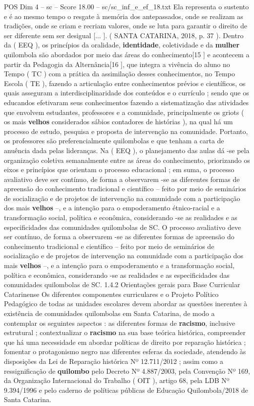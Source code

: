 \begin{textsample}{POS Dim 4 – sc – Score 18.00 – sc/sc\_inf\_e\_ef\_18.txt}
Ela representa o sustento e é ao mesmo tempo o resgate à memória dos antepassados, onde se realizam as tradições, onde se criam e recriam valores, onde se luta para garantir o direito de ser diferente sem ser desigual [... ]. ( SANTA CATARINA, 2018, p. 37 ).
Dentro da ( EEQ ), os princípios da oralidade, \textbf{identidade}, coletividade e da \textbf{mulher} quilombola são abordados por meio das áreas do conhecimento[15 ] e acontecem a partir da Pedagogia da Alternância[16 ], que integra a vivência do aluno no Tempo ( TC ) com a prática da assimilação desses conhecimentos, no Tempo Escola ( TE ), fazendo a articulação entre conhecimentos prévios e científicos, os quais asseguram a interdisciplinaridade dos conteúdos e o currículo ; sendo que os educandos efetivaram seus conhecimentos fazendo a sistematização das atividades que envolvem estudantes, professores e a comunidade, principalmente os griots ( os mais \textbf{velhos} considerados sábios contadores de histórias ), na qual há um processo de estudo, pesquisa e proposta de intervenção na comunidade.
Portanto, os professores são preferencialmente quilombolas e que tenham a carta de anuência dada pelas lideranças.
Na ( EEQ ), o planejamento das aulas dá -se pela organização coletiva semanalmente entre as áreas do conhecimento, priorizando os eixos e princípios que orientam o processo educacional ; em suma, o processo avaliativo deve ser contínuo, de forma a observarem -se as diferentes formas de apreensão do conhecimento tradicional e científico – feito por meio de seminários de socialização e de projetos de intervenção na comunidade com a participação dos mais \textbf{velhos} –, e a intenção para o empoderamento étnico-racial e a transformação social, política e econômica, considerando -se as realidades e as especificidades das comunidades quilombolas de SC.
O processo avaliativo deve ser contínuo, de forma a observarem -se as diferentes formas de apreensão do conhecimento tradicional e científico – feito por meio de seminários de socialização e de projetos de intervenção na comunidade com a participação dos mais \textbf{velhos} –, e a intenção para o empoderamento e a transformação social, política e econômica, considerando -se as realidades e as especificidades das comunidades quilombolas de SC. 1.4.2 Orientações gerais para Base Curricular Catarinense Os diferentes componentes curriculares e o Projeto Político Pedagógico de todas as unidades escolares devem abordar as questões inerentes à existência de comunidades quilombolas em Santa Catarina, de modo a contemplar os seguintes aspectos : as diferentes formas de \textbf{racismo}, inclusive estrutural ; contextualizar o \textbf{racismo} na sua base teórica histórica, compreender que há uma necessidade em abordar políticas de direito por reparação histórica ; fomentar o protagonismo negro nas diferentes esferas da sociedade, atendendo às disposições da Lei de Reparação histórica Nº 12.711/2012 ; assim como a ressignificação de \textbf{quilombo} pelo Decreto Nº 4.887/2003, pela Convenção Nº 169, da Organização Internacional do Trabalho ( OIT ), artigo 68, pela LDB Nº 9.394/1996 e pelo caderno de políticas públicas de Educação Quilombola/2018 de Santa Catarina.

\end{textsample}
